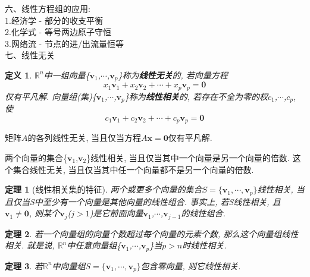 \documentclass[UTF8,fontset=ubuntu]{ctexart}
\theoremstyle{nonumberplain}
\newtheorem{definition}{定义}
\theoremstyle{break}
\newtheorem{theorem}{定理}
\theoremstyle{empty}
\begin{document}
六、线性方程组的应用:\\[1ex]
1.经济学 - 部分的收支平衡\\
2.化学式 - 等号两边原子守恒\\
3.网络流 - 节点的进/出流量恒等\\[4ex]

七、线性无关\\[-2ex]
\begin{definition}
$\mathbb{R}^n$中一组向量\{$\bm{v}_1$,$\cdots$,$\bm{v}_p$\}称为\textbf{线性无关}的, 若向量方程
\[x_1\bm{v}_1+x_2\bm{v}_2+\cdots+x_p\bm{v}_p=\bm{0}\]
仅有平凡解. 向量组(集)\{$\bm{v}_1$,$\cdots$,$\bm{v}_p$\}称为\textbf{线性相关}的, 若存在不全为零的权$c_1$,$\cdots$,$c_p$, 使
\[c_1\bm{v}_1+c_2\bm{v}_2+\cdots+c_p\bm{v}_p=\bm{0}\]
\end{definition}\vspace{2ex}

\begin{law}
矩阵$A$的各列线性无关, 当且仅当方程$A\bm{x}=\bm{0}$仅有平凡解.
\end{law}\vspace{2ex}

\begin{law}
两个向量的集合\{$\bm{v}_1$,$\bm{v}_2$\}线性相关, 当且仅当其中一个向量是另一个向量的倍数. 这个集合线性无关, 当且仅当其中任一个向量都不是另一个向量的倍数.
\end{law}\vspace{4ex}

\begin{theorem}[线性相关集的特征]
两个或更多个向量的集合$S=\{\bm{v}_1,\cdots,\bm{v}_p\}$线性相关, 当且仅当S中至少有一个向量是其他向量的线性组合. 事实上, 若S线性相关, 且$\bm{v}_1\neq\bm{0}$, 则某个$\bm{v}_j$($j>1$)是它前面向量$\bm{v}_1$,$\cdots$,$\bm{v}_{j-1}$的线性组合.
\end{theorem}\vspace{4ex}

\begin{theorem}
若一个向量组的向量个数超过每个向量的元素个数, 那么这个向量组线性相关. 就是说, $\mathbb{R}^n$中任意向量组\{$\bm{v}_1$,$\cdots$,$\bm{v}_p$\}当$p>n$时线性相关.
\end{theorem}\vspace{4ex}

\begin{theorem}
若$\mathbb{R}^n$中向量组$S=\{\bm{v}_1,\cdots,\bm{v}_p\}$包含零向量, 则它线性相关.
\end{theorem}\vspace{4ex}
\end{document}
